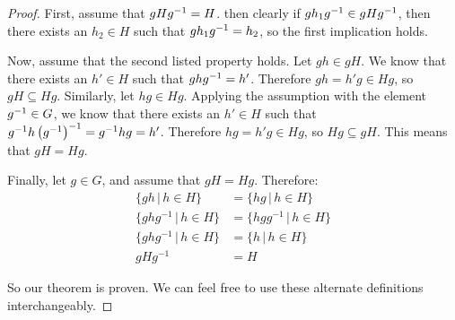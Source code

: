 \begin{proof}
First, assume that $gHg^{-1} = H$. then clearly if $gh_1g^{-1} \in gHg^{-1}$, then there exists an $h_2 \in H$ such that $gh_1g^{-1} = h_2$, so the first implication holds.

Now, assume that the second listed property holds. Let $gh \in gH$. We know that there exists an $h' \in H$ such that $ghg^{-1} = h'$. Therefore $gh = h'g \in Hg$, so $gH \subseteq Hg$. Similarly, let $hg \in Hg$. Applying the assumption with the element $g^{-1} \in G$, we know that there exists an $h' \in H$ such that $g^{-1}h\left(g^{-1}\right)^{-1} = g^{-1}hg = h'$. Therefore $hg = h'g \in Hg$, so $Hg \subseteq gH$. This means that $gH = Hg$.

Finally, let $g \in G$, and assume that $gH = Hg$. Therefore:
\begin{align*}
    \{gh \,|\, h \in H\} &= \{hg \,|\, h \in H\} \\
    \{ghg^{-1} \,|\, h \in H\} &= \{hgg^{-1} \,|\, h \in H\} \\
    \{ghg^{-1} \,|\, h \in H\} &= \{h \,|\, h \in H\} \\
    gHg^{-1} &= H
\end{align*}

So our theorem is proven. We can feel free to use these alternate definitions interchangeably.

\end{proof}
